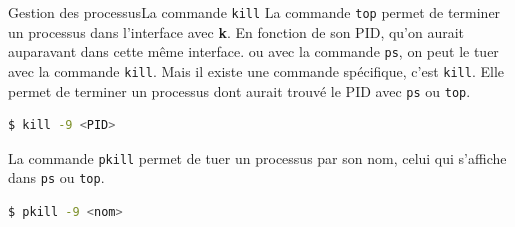 \documentclass{beamer}
\begin{document}
    \begin{frame}[fragile]{Gestion des processus}{La commande \lstinline{kill}}
        La commande \lstinline{top} permet de terminer un processus dans l'interface avec \textbf{k}.
        En fonction de son PID, qu'on aurait auparavant dans cette même interface.
        ou avec la commande \lstinline{ps}, on peut le tuer avec la commande \lstinline{kill}.
        \bigbreak
        Mais il existe une commande spécifique, c'est \lstinline{kill}.
        Elle permet de terminer un processus dont aurait trouvé le PID avec \lstinline{ps} ou \lstinline{top}.
        \begin{lstlisting}[language=bash]
$ kill -9 <PID>
        \end{lstlisting}
        \bigbreak
        La commande \lstinline{pkill} permet de tuer un processus par son nom, celui qui s'affiche dans \lstinline{ps} ou \lstinline{top}.
        \begin{lstlisting}[language=bash]
$ pkill -9 <nom>
        \end{lstlisting}
    \end{frame}
\end{document}
